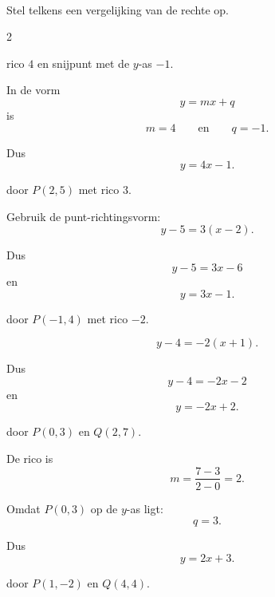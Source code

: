 \documentclass{ximera}
\begin{document}
\begin{oefening}{\oefB\ESS}
\\

Stel telkens een vergelijking van de rechte op.

\begin{multicols}{2}


\begin{question}
rico $4$ en snijpunt met de $y$-as $-1$.

\begin{oplossing}
In de vorm
\[
y=mx+q
\]
is
\[
m=4
\qquad\text{en}\qquad
q=-1.
\]

Dus
\[
\boxed{y=4x-1}.
\]
\end{oplossing}
\end{question}


\begin{question}
door $P(2,5)$ met rico $3$.

\begin{oplossing}
Gebruik de punt-richtingsvorm:
\[
y-5=3(x-2).
\]

Dus
\[
y-5=3x-6
\]
en
\[
\boxed{y=3x-1}.
\]
\end{oplossing}
\end{question}


\begin{question}
door $P(-1,4)$ met rico $-2$.

\begin{oplossing}
\[
y-4=-2(x+1).
\]

Dus
\[
y-4=-2x-2
\]
en
\[
\boxed{y=-2x+2}.
\]
\end{oplossing}
\end{question}


\begin{question}
door $P(0,3)$ en $Q(2,7)$.

\begin{oplossing}
De rico is
\[
m=\frac{7-3}{2-0}=2.
\]

Omdat $P(0,3)$ op de $y$-as ligt:
\[
q=3.
\]

Dus
\[
\boxed{y=2x+3}.
\]
\end{oplossing}
\end{question}


\begin{question}
door $P(1,-2)$ en $Q(4,4)$.


\end{question}
\end{multicols}
\end{oefening}
\end{document}

